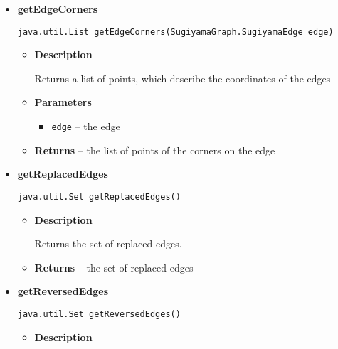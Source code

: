 {{{{{{{{{\begin{itemize}
{\begin{itemize}
{Adds a new edge corner to the specified edge. The index specifies the position between other edge corners. Every edge corner is connected with the corners with index +/- 1 of it's index. Counting starts at 0 at the endpoint at the source vertex of the edge. End- and startpoint are also counted as corners
}
\item{
{\bf  Parameters}
  \begin{itemize}
   \item{
\texttt{edge} -- the edge to add a new corner}
   \item{
\texttt{x} -- the x coordinate of the corner}
   \item{
\texttt{y} -- the y coordinate of the corner}
   \item{
\texttt{index} -- the index on the edge of the corner}
  \end{itemize}
}%
\end{itemize}
}%
\item{ 
{\bf  getEdgeCorners}\\
\begin{lstlisting}[frame=none]
java.util.List getEdgeCorners(SugiyamaGraph.SugiyamaEdge edge)\end{lstlisting} %
\begin{itemize}
\item{
{\bf  Description}

Returns a list of points, which describe the coordinates of the edges
}
\item{
{\bf  Parameters}
  \begin{itemize}
   \item{
\texttt{edge} -- the edge}
  \end{itemize}
}%
\item{{\bf  Returns} -- 
the list of points of the corners on the edge 
}%
\end{itemize}
}%
\item{ 
{\bf  getReplacedEdges}\\
\begin{lstlisting}[frame=none]
java.util.Set getReplacedEdges()\end{lstlisting} %
\begin{itemize}
\item{
{\bf  Description}

Returns the set of replaced edges.
}
\item{{\bf  Returns} -- 
the set of replaced edges 
}%
\end{itemize}
}%
\item{ 
{\bf  getReversedEdges}\\
\begin{lstlisting}[frame=none]
java.util.Set getReversedEdges()\end{lstlisting} %
\begin{itemize}
\item{
{\bf  Description}

}
\end{itemize}}
\end{itemize}}}}}}}}}}
